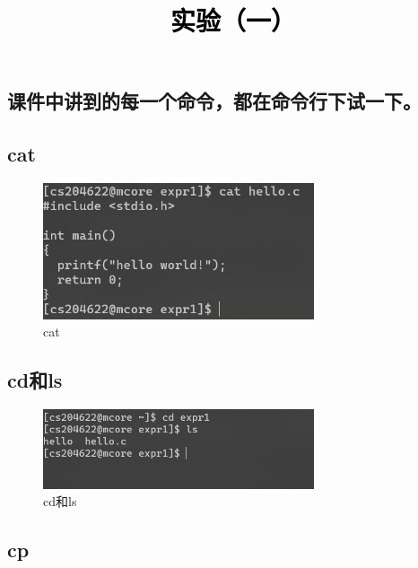 \documentclass[a4paper,twoside]{article}
\newcommand{\PaperTitle}{实验（一）}  %
\begin{document}
\newpage

\title{
	\Large{\textcolor{black}{\PaperTitle}}
}
	
	
\maketitle
	
\tableofcontents
 
\newpage
\setcounter{page}{1}

\begin{spacing}{1.2}

\section{课件中讲到的每一个命令，都在命令行下试一下。}

\subsection{cat}

\begin{figure}[H]
	\centering
	\includegraphics[width=8.0cm]{cat.png}
	\caption{cat}
\end{figure}

\subsection{cd和ls}

\begin{figure}[H]
	\centering
	\includegraphics[width=8.0cm]{cdls.png}
	\caption{cd和ls}
\end{figure}

\subsection{cp}


\end{spacing}
\end{document}
